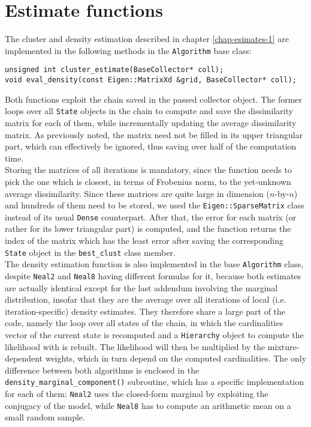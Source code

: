 \section{Estimate functions}\label{estimates-imp}
The cluster and density estimation described in chapter \ref{chap-esimates-1} are implemented in the following methods in the \verb|Algorithm| base class:
\begin{verbatim}
unsigned int cluster_estimate(BaseCollector* coll);
void eval_density(const Eigen::MatrixXd &grid, BaseCollector* coll);
\end{verbatim}
Both functions exploit the chain saved in the passed collector object.
The former loops over all \verb|State| objects in the chain to compute and save the dissimilarity matrix for each of them, while incrementally updating the average dissimilarity matrix.
As previously noted, the matrix need not be filled in its upper triangular part, which can effectively be ignored, thus saving over half of the computation time. \\
Storing the matrices of all iterations is mandatory, since the function needs to pick the one which is closest, in terms of Frobenius norm, to the yet-unknown average dissimilarity.
Since these matrices are quite large in dimension ($n$-by-$n$) and hundreds of them need to be stored, we used the \verb|Eigen::SparseMatrix| class instead of its usual \verb|Dense| counterpart.
After that, the error for each matrix (or rather for its lower triangular part) is computed, and the function returns the index of the matrix which has the least error after saving the corresponding \verb|State| object in the \verb|best_clust| class member. \\[8pt]
The density estimation function is also implemented in the base \verb|Algorithm| class, despite \verb|Neal2| and \verb|Neal8| having different formulas for it, because both estimates are actually identical except for the last addendum involving the marginal distribution, insofar that they are the average over all iterations of local (i.e. iteration-specific) density estimates.
They therefore share a large part of the code, namely the loop over all states of the chain, in which the cardinalities vector of the current state is recomputed and a \verb|Hierarchy| object to compute the likelihood with is rebuilt.
The likelihood will then be multiplied by the mixture-dependent weights, which in turn depend on the computed cardinalities.
The only difference between both algorithms is enclosed in the \verb|density_marginal_component()| subroutine, which has a specific implementation for each of them: \verb|Neal2| uses the closed-form marginal by exploiting the conjugacy of the model, while \verb|Neal8| has to compute an arithmetic mean on a small random sample.
